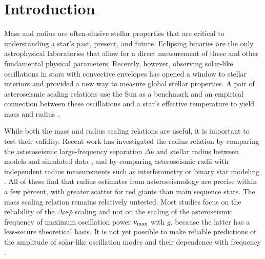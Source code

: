
\section{Introduction}\label{intro}


Mass and radius are often-elusive stellar properties that are critical to understanding a star's past, present, and future. Eclipsing binaries are the only astrophysical laboratories that allow for a direct measurement of these and other fundamental physical parameters. Recently, however, observing solar-like oscillations in stars with convective envelopes has opened a window to stellar interiors and provided a new way to measure global stellar properties. A pair of asteroseismic scaling relations use the Sun as a benchmark and an empirical connection between these oscillations and a star's effective temperature to yield mass and radius \citep{kje95,hub10,mos13}.

While both the mass and radius scaling relations are useful, it is important to test their validity. Recent work has investigated the radius relation by comparing the asteroseismic large-frequency separation $\Delta \nu$ and stellar radius between models and simulated data \citep[e.g.][]{ste09,whi11,mig13}, and by comparing asteroseismic radii with independent radius measurements such as interferometry or binary star modeling \citep[e.g.][]{hub11,hub12,sil12}. All of these find that radius estimates from asteroseismology are precise within a few percent, with greater scatter for red giants than main sequence stars. The mass scaling relation remains relatively untested. Most studies focus on the reliability of the $\Delta\nu$-$\bar\rho$ scaling and not on the scaling of the asteroseismic frequency of maximum oscillation power $\nu_{\rm{max}}$ with $g$, because the latter has a less-secure theoretical basis. It is not yet possible to make reliable predictions of the amplitude of solar-like oscillation modes and their dependence with frequency \citep{Christensen-Dalsgaard_2012}.

